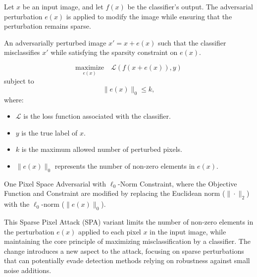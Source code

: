 Let \( x \) be an input image, and let \( f(x) \) be the classifier's output. The adversarial perturbation \( e(x) \) is applied to modify the image while ensuring that the perturbation remains sparse.

An adversarially perturbed image \( x' = x + e(x) \) such that the classifier misclassifies \( x' \) while satisfying the sparsity constraint on \( e(x) \).

\[
\underset{e(x)}{\text{maximize}} \quad \mathcal{L}(f(x + e(x)), y)
\]
subject to 
\[
\| e(x) \|_0 \leq k,
\]
where:
\begin{itemize}
    \item \( \mathcal{L} \) is the loss function associated with the classifier.
    \item \( y \) is the true label of \( x \).
    \item \( k \) is the maximum allowed number of perturbed pixels.
    \item \( \| e(x) \|_0 \) represents the number of non-zero elements in \( e(x) \).
\end{itemize}

One Pixel Space Adversarial with $\ell_0$-Norm Constraint, where the Objective Function and Constraint are modified by replacing the Euclidean norm ($\| \cdot \|_2$) with the $\ell_0$-norm ($\| e(x) \|_0$). 

This Sparse Pixel Attack (SPA) variant limits the number of non-zero elements in the perturbation $e(x)$ applied to each pixel $x$ in the input image, while maintaining the core principle of maximizing misclassification by a classifier. The change introduces a new aspect to the attack, focusing on sparse perturbations that can potentially evade detection methods relying on robustness against small noise additions.